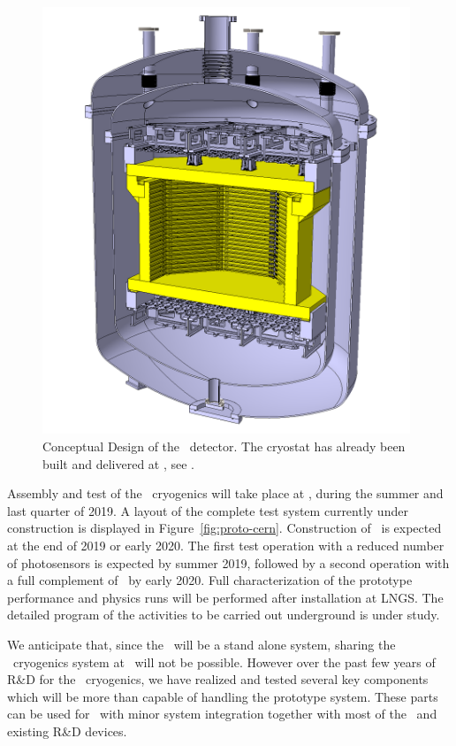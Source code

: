 \begin{figure}[!t]
\centering
\includegraphics[width=0.98\textwidth]{./Figures/proto_1ton_newdesign_crop.png}
\caption[Conceptual design of the \DSps\ detector]{Conceptual Design of the \DSps\ detector.  The cryostat has already been built and delivered at \CERN, see .}
\label{fig:proto_1ton}
\end{figure}

Assembly and test of the \DSks\ cryogenics will take place at \CERN, during the summer and last quarter of 2019. A layout of the complete test system currently under construction is displayed in Figure~\ref{fig:proto-cern}. Construction of \DSps\ is expected at the end of 2019 or early 2020. The first test operation with a reduced number of photosensors is expected by summer 2019, followed by a second operation with a full complement of \DSkPdms\ by early 2020. Full characterization of the prototype performance and physics runs will be performed after installation at LNGS. The detailed program of the activities to be carried out underground is under study.

We anticipate that, since the \DSps\ will be a stand alone system, sharing the \DSks\ cryogenics system at \LNGS\ will not be possible. However over the past few years of R\&D for the \DSks\ cryogenics, we have realized and tested several key components which will be more than capable of handling the prototype system. These parts can be used for \DSps\ with minor system integration together with most of the \DSfs\ and existing R\&D devices.

